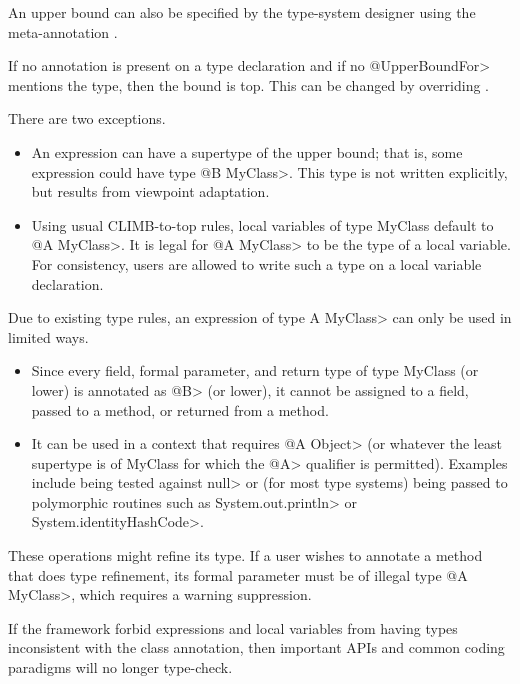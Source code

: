 An upper bound can also be specified by the type-system designer using the meta-annotation
.

If no annotation is present on a type declaration and if no \<@UpperBoundFor> mentions the type, then
the bound is top. This can be changed by overriding
.

There are two exceptions.
\begin{itemize}
  \item
  An expression can have a supertype of the upper bound; that is, some expression could
  have type \<@B MyClass>.  This type is not written explicitly, but results from viewpoint adaptation.
  \item
  Using usual CLIMB-to-top rules, local variables of type MyClass default to \<@A MyClass>.
  It is legal for \<@A MyClass> to be the type of a local variable.
  For consistency, users are allowed to write such a type on a local variable declaration.
\end{itemize}

Due to existing type rules, an expression of type \<A MyClass> can only be used in limited ways.
\begin{itemize}
  \item
  Since every field, formal parameter, and return type of type MyClass (or lower) is annotated as
  \<@B> (or lower), it cannot be assigned to a field, passed to a method, or returned from a method.
  \item
  It can be used in a context that requires \<@A Object> (or whatever the least supertype is of MyClass
  for which the \<@A> qualifier is permitted).  Examples include being tested against \<null> or
  (for most type systems) being passed to polymorphic routines such as \<System.out.println> or \<System.identityHashCode>.
\end{itemize}

These operations might refine its type.  If a user wishes to annotate a method that does type refinement,
its formal parameter must be of illegal type \<@A MyClass>, which requires a warning suppression.

If the framework forbid expressions and local variables from having types inconsistent with the class annotation,
then important APIs and common coding paradigms will no longer type-check.

